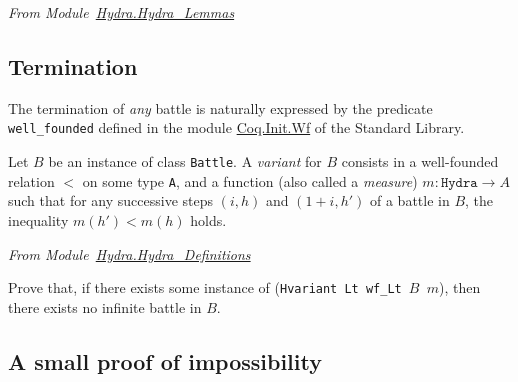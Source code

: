 \vspace{4pt}
\emph{From Module~\href{../theories/html/hydras.Hydra.Hydra_Lemmas.html\#next_round_dec}{Hydra.Hydra\_Lemmas}}



\subsection{Termination}

The termination of \emph{any}  battle is naturally expressed by the predicate \texttt{well\_founded} defined in the module \href{https://coq.inria.fr/distrib/current/stdlib/Coq.Init.Wf.html}{Coq.Init.Wf} 
 of the Standard Library.






Let $B$ be an instance of class \texttt{Battle}. A \emph{variant} for $B$ consists
in a well-founded relation $<$  on some type \texttt{A}, and a function
(also called a \emph{measure}) $m:\texttt{Hydra}\rightarrow A$ such that for any successive steps $(i,h)$ and $(1+i,h')$  of a battle in $B$, the inequality $m(h')<m(h)$ holds.


\vspace{4pt}
\noindent

\emph{From Module~\href{../theories/html/hydras.Hydra.Hydra_Definitions.html\#Hvariant}{Hydra.Hydra\_Definitions}}


\label{sect:hvariant-def}





\begin{exercise}
 Prove that, if there exists some  instance of (\texttt{Hvariant Lt wf\_Lt $B$ $m$}), then there exists no infinite battle in  $B$.
\end{exercise}




\subsection{A  small proof of impossibility}

\label{omega-case}

